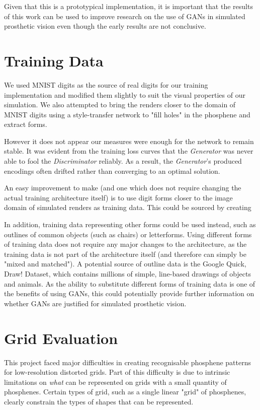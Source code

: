\documentclass[a4paper,11pt,openany]{book}
\begin{document}
Given that this is a prototypical implementation, it is important that the results of this work can be used to improve research on the use of GANs in simulated prosthetic vision even though the early results are not conclusive.

\section*{Training Data}
\label{sec:orgfe1805b}

We used MNIST digits as the source of real digits for our training implementation and modified them slightly to suit the visual properties of our simulation.
We also attempted to bring the renders closer to the domain of MNIST digits using a style-transfer network to "fill holes" in the phosphene and extract forms.

However it does not appear our measures were enough for the network to remain stable.
It was evident from the training loss curves that the \emph{Generator} was never able to fool the \emph{Discriminator} reliably.
As a result, the \emph{Generator}'s produced encodings often drifted rather than converging to an optimal solution.

An easy improvement to make (and one which does not require changing the actual training architecture itself) is to use digit forms closer to the image domain of simulated renders as training data.
This could be sourced by creating

In addition, training data representing other forms could be used instead, such as outlines of common objects (such as chairs) or letterforms.
Using different forms of training data does not require any major changes to the architecture, as the training data is not part of the architecture itself (and therefore can simply be "mixed and matched").
A potential source of outline data is the Google Quick, Draw! Dataset, which contains millions of simple, line-based drawings of objects and animals.
As the ability to substitute different forms of training data is one of the benefits of using GANs, this could potentially provide further information on whether GANs are justified for simulated prosthetic vision.

\section*{Grid Evaluation}
\label{sec:orgaf360aa}

This project faced major difficulties in creating recognisable phosphene patterns for low-resolution distorted grids.
Part of this difficulty is due to intrinsic limitations on \emph{what} can be represented on grids with a small quantity of phosphenes.
Certain types of grid, such as a single linear "grid" of phosphenes, clearly constrain the types of shapes that can be represented.
\end{document}
